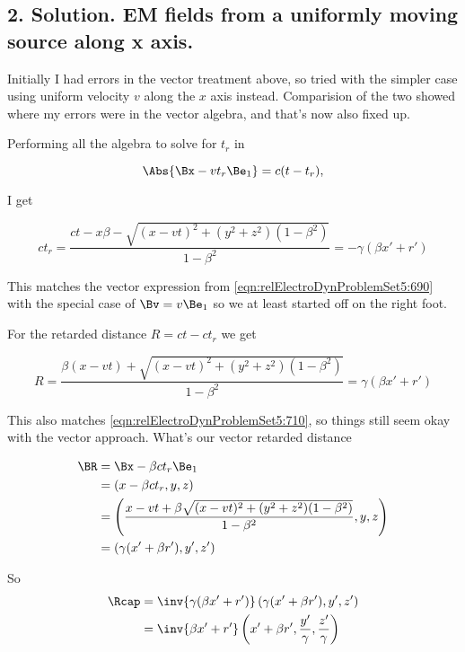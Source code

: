 \subsection{2. Solution.  EM fields from a uniformly moving source along x axis.}

Initially I had errors in the vector treatment above, so tried with the simpler case using uniform velocity $v$ along the $x$ axis instead.  Comparision of the two showed where my errors were in the vector algebra, and that's now also fixed up.

Performing all the algebra to solve for $t_r$ in 

\begin{equation}\label{eqn:relElectroDynProblemSet5:860}
\Abs{\Bx - v t_r \Be_1} = c(t - t_r),
\end{equation}

I get

\begin{equation}\label{eqn:relElectroDynProblemSet5:880}
c t_r = \frac{c t - x \beta - \sqrt{ (x- v t)^2 + (y^2 + z^2)(1-\beta^2) } }{ 1 - \beta^2 } = - \gamma (\beta x' + r' )
\end{equation}

This matches the vector expression from \ref{eqn:relElectroDynProblemSet5:690} with the special case of $\Bv = v \Be_1$ so we at least started off on the right foot.

For the retarded distance $R = ct - c t_r$ we get

\begin{equation}\label{eqn:relElectroDynProblemSet5:900}
R = \frac{ \beta( x - v t) + \sqrt{ (x- v t)^2 + (y^2 + z^2)(1-\beta^2) } }{ 1 - \beta^2 } = \gamma( \beta x' + r' )
\end{equation}

This also matches \ref{eqn:relElectroDynProblemSet5:710}, so things still seem okay with the vector approach.  What's our vector retarded distance

\begin{align*}
\BR 
&= \Bx - \beta c t_r \Be_1 \\
&= (x - \beta c t_r, y, z) \\
&= \left( \frac{ x - v t + \beta \sqrt{ (x- v t)^2 + (y^2 + z^2)(1-\beta^2) } }{ 1 - \beta^2 }, y, z \right) \\
&= \left( \gamma (x' + \beta r'), y', z' \right)
\end{align*}

So 
\begin{align*}
\Rcap 
&= \inv{ \gamma (\beta x' + r') } \left( \gamma(x' + \beta r'), y', z' \right) \\
&= \inv{ \beta x' + r' } \left( x' + \beta r', \frac{y'}{\gamma}, \frac{z'}{\gamma} \right)
\end{align*}

